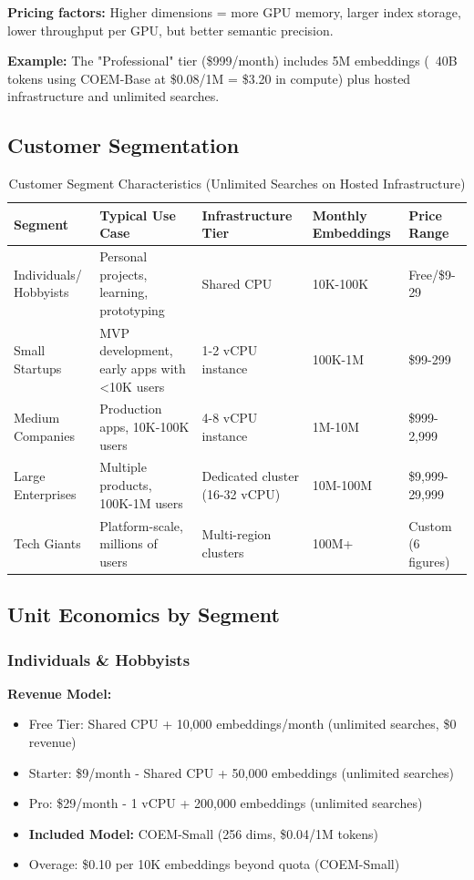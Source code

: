 \textbf{Pricing factors:} Higher dimensions = more GPU memory, larger index storage, lower throughput per GPU, but better semantic precision.

\textbf{Example:} The "Professional" tier (\$999/month) includes 5M embeddings (~40B tokens using COEM-Base at \$0.08/1M = \$3.20 in compute) plus hosted infrastructure and unlimited searches.

\subsection{Customer Segmentation}

\begin{table}[ht]
\centering
\small
\begin{tabular}{|l|p{2.8cm}|p{2.8cm}|p{2.0cm}|p{2.0cm}|}
\hline
\textbf{Segment} & \textbf{Typical Use Case} & \textbf{Infrastructure Tier} & \textbf{Monthly Embeddings} & \textbf{Price Range} \\
\hline
Individuals/ Hobbyists & Personal projects, learning, prototyping & Shared CPU & 10K-100K & Free/\$9-29 \\
\hline
Small Startups & MVP development, early apps with <10K users & 1-2 vCPU instance & 100K-1M & \$99-299 \\
\hline
Medium Companies & Production apps, 10K-100K users & 4-8 vCPU instance & 1M-10M & \$999-2,999 \\
\hline
Large Enterprises & Multiple products, 100K-1M users & Dedicated cluster (16-32 vCPU) & 10M-100M & \$9,999-29,999 \\
\hline
Tech Giants & Platform-scale, millions of users & Multi-region clusters & 100M+ & Custom (6 figures) \\
\hline
\end{tabular}
\caption{Customer Segment Characteristics (Unlimited Searches on Hosted Infrastructure)}
\end{table}

\subsection{Unit Economics by Segment}

\subsubsection{Individuals \& Hobbyists}

\textbf{Revenue Model:}
\begin{itemize}[noitemsep]
    \item Free Tier: Shared CPU + 10,000 embeddings/month (unlimited searches, \$0 revenue)
    \item Starter: \$9/month - Shared CPU + 50,000 embeddings (unlimited searches)
    \item Pro: \$29/month - 1 vCPU + 200,000 embeddings (unlimited searches)
    \item \textbf{Included Model:} COEM-Small (256 dims, \$0.04/1M tokens)
    \item Overage: \$0.10 per 10K embeddings beyond quota (COEM-Small)
\end{itemize}

